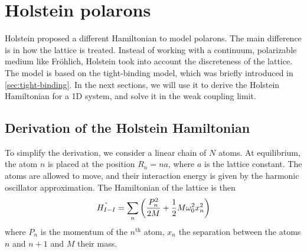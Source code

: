 \section{Holstein polarons}
Holstein proposed a different Hamiltonian to model polarons. The main difference is in how the lattice is treated. Instead of working with a continuum, polarizable medium like Fröhlich, Holstein took into account the discreteness of the lattice. The model is based on the tight-binding model, which was briefly introduced in \cref{sec:tight-binding}. In the next sections, we will use it to derive the Holstein Hamiltonian for a 1D system, and solve it in the weak coupling limit.

\subsection{Derivation of the Holstein Hamiltonian}
To simplify the derivation, we consider a linear chain of $N$ atoms. At equilibrium, the atom $n$ is placed at the position $R_n = na$, where $a$ is the lattice constant. The atoms are allowed to move, and their interaction energy is given by the harmonic oscillator approximation. The Hamiltonian of the lattice is then
\begin{equation}
    \hat{H_{I-I}} = \sum_n \left( \frac{{P}_n^2}{2M} + \frac{1}{2} M\omega_0^2x_n^2 \right)
\end{equation}
where $P_n$ is the momentum of the $n^\text{th}$ atom, $x_n$ the separation between the atoms $n$ and $n+1$ and $M$ their mass.

